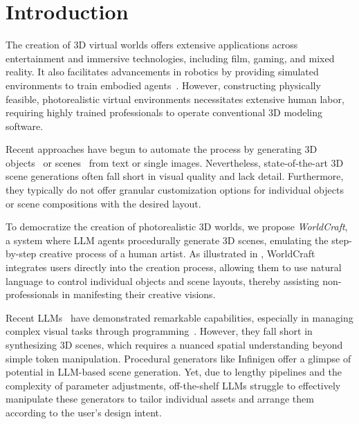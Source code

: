 
\section{Introduction}
The creation of 3D virtual worlds offers extensive applications across entertainment and immersive technologies, including film, gaming, and mixed reality. It also facilitates advancements in robotics by providing simulated environments to train embodied agents~\cite{kolve2017ai2, srivastava2022behavior, xiang2020sapien,szot2021habitat, yang2024holodeck}.
However, constructing physically feasible, photorealistic virtual environments necessitates extensive human labor, requiring highly trained professionals to operate conventional 3D modeling software. 



Recent approaches have begun to automate the process by generating 3D objects~\cite{poole2022dreamfusion,lin2023magic3d,hong2023lrm,zhang2024clay,siddiqui2024meta} or scenes~\cite{li2022infinitenature, yu2024wonderjourney, NEURIPS2023_7d62a85e, li2025dreamscene, zhou2025dreamscene360, po2024compositional} from text or single images. Nevertheless, state-of-the-art 3D scene generations often fall short in visual quality and lack detail. Furthermore, they typically do not offer granular customization options for individual objects or scene compositions with the desired layout.


To democratize the creation of photorealistic 3D worlds, we propose \emph{WorldCraft}, a system where LLM agents procedurally generate 3D scenes, emulating the step-by-step creative process of a human artist. As illustrated in , WorldCraft integrates users directly into the creation process, allowing them to use natural language to control individual objects and scene layouts, thereby assisting non-professionals in manifesting their creative visions.



Recent LLMs~\cite{achiam2023gpt, dubey2024llama, team2023gemini} have demonstrated remarkable capabilities, especially in managing complex visual tasks through programming~\cite{gupta2023visual}. However, they fall short in synthesizing 3D scenes, which requires a nuanced spatial understanding beyond simple token manipulation.
%
Procedural generators like Infinigen \cite{infinigen2023infinite, infinigen2024indoors} offer a glimpse of potential in LLM-based scene generation. Yet, due to lengthy pipelines and the complexity of parameter adjustments, off-the-shelf LLMs struggle to effectively manipulate these generators to tailor individual assets and arrange them according to the user’s design intent.

